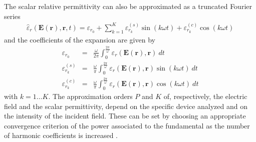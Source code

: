 \documentclass[journal]{IEEEtran}
\renewcommand{\vec}[1]{\mathbf{#1}}
\begin{document}
The scalar relative permittivity can also be approximated as a truncated Fourier series 
\begin{eqnarray} \label{eq:eps}
\hat{{\varepsilon}}_r(\vec{E}(\vec{r}), \vec{r}, t) = {\varepsilon}_{r_0} + \sum^K_{k=1} {\varepsilon}_{r_k}^{(s)} \sin(k \omega t) + {\varepsilon}_{r_k}^{(c)} \cos(k \omega t)
\end{eqnarray} and the coefficients of the expansion are given by
\begin{eqnarray} \label{eq:epsCoeffs}
{\varepsilon}_{r_{0}} & = & \frac{\omega}{2\pi}\int_0^{\frac{2\pi}{\omega}} {\varepsilon}_r(\vec{E}(\vec{r}), \vec{r}) \ dt \\
{\varepsilon}_{r_{k}}^{(s)} & = & \frac{\omega}{\pi}\int_0^{\frac{2\pi}{\omega}} {\varepsilon}_r(\vec{E}(\vec{r}), \vec{r}) \sin(k \omega t) \ dt \\
{\varepsilon}_{r_{k}}^{(c)} & = & \frac{\omega}{\pi}\int_0^{\frac{2\pi}{\omega}} {\varepsilon}_r(\vec{E}(\vec{r}), \vec{r}) \cos(k \omega t) \ dt
\end{eqnarray} with $k = 1 \dots K$. The approximation orders $P$ and $K$ of, respectively, the electric field and the scalar permittivity, depend on the specific device analyzed and on the intensity of the incident field. These can be set by choosing an appropriate convergence criterion of the power associated to the fundamental as the number of harmonic coefficients is increased \cite{Gyselinck2002}.
\end{document}
